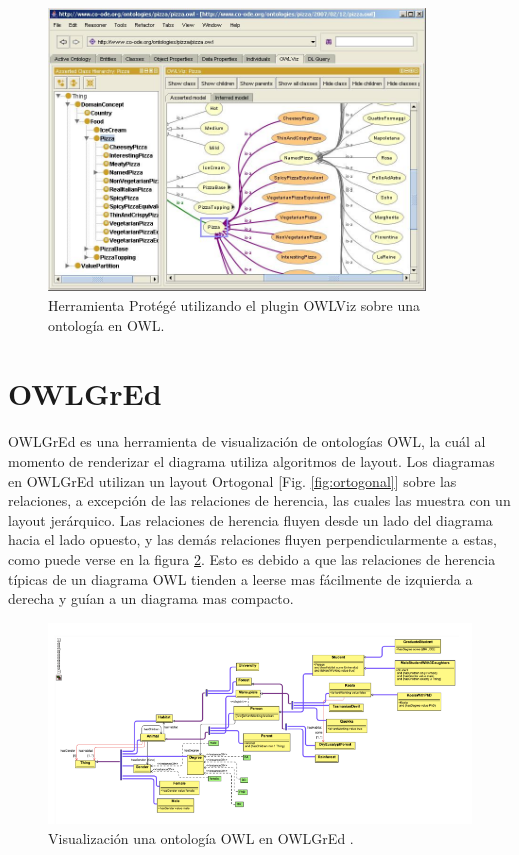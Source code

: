 \begin{figure}[h]
	\centering
	\includegraphics[width=10cm]{imagenes/owlviz.jpg}
	\caption{Herramienta Protégé utilizando el plugin OWLViz sobre una ontología en OWL.}
	\label{fig:owlviz}
\end{figure}



\section{OWLGrEd}
OWLGrEd \cite{liepinvs2014owlgred} es una herramienta de visualización de ontologías OWL, la cuál al momento de renderizar el diagrama utiliza algoritmos de layout. Los diagramas en OWLGrEd utilizan un layout Ortogonal \cite{bekos2012smooth}[Fig. \ref{fig:ortogonal}] sobre las relaciones, a excepción de las relaciones de herencia, las cuales las muestra con un layout jerárquico. Las relaciones de herencia fluyen desde un lado del diagrama hacia el lado opuesto, y las demás relaciones fluyen perpendicularmente a estas, como puede verse en la figura \ref{fig:owlgred}. Esto es debido a que las relaciones de herencia típicas de un diagrama OWL tienden a leerse mas fácilmente de izquierda a derecha y guían a un diagrama mas compacto.

\begin{figure}[h]
	\centering
	\includegraphics[width=13cm]{imagenes/owlgred.png}
	\caption{Visualización una ontología OWL en OWLGrEd \cite{liepinvs2014owlgred}.}
	\label{fig:owlgred}
\end{figure}

